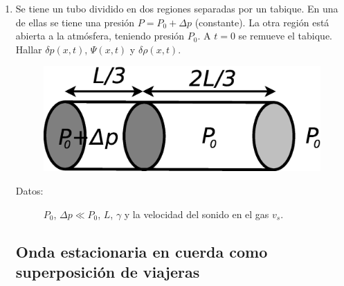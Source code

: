 \documentclass[11pt,spanish,a4paper]{article}
\begin{document}
\begin{enumerate}
\item Se tiene un tubo dividido en dos regiones separadas por un tabique.
En una de ellas se tiene una presión $P=P_{0}+\Delta p$ (constante).
La otra región está abierta a la atmósfera, teniendo presión $P_{0}$.
A $t=0$ se remueve el tabique. Hallar $\delta p(x,t)$, $\Psi(x,t)$
y $\delta\rho(x,t)$.
\begin{figure}[H]
\centering{}\includegraphics[clip,scale=0.25]{ej1-31}
\end{figure}
\begin{description}
\item [{Datos:}] $P_{0}$, $\Delta p\ll P_{0}$, $L$, $\gamma$ y la velocidad
del sonido en el gas $v_{s}$.
\end{description}



\subsection*{Onda estacionaria en cuerda como superposición de viajeras}


\end{enumerate}
\end{document}
